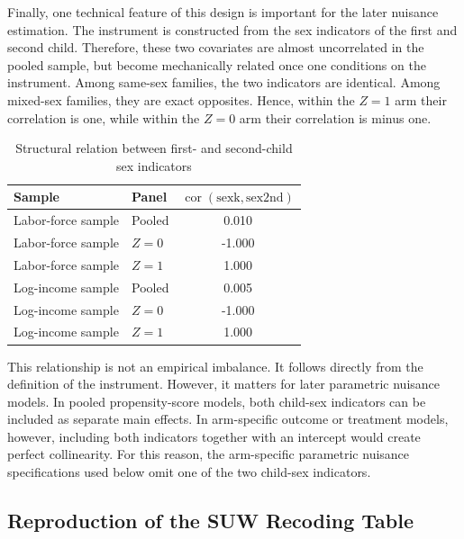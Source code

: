 \documentclass[12pt, a4paper, oneside]{article}
\theoremstyle{plain}
\theoremstyle{definition}
\begin{document}
Finally, one technical feature of this design is important for the later nuisance estimation. The instrument is constructed from the sex indicators of the first and second child. Therefore, these two covariates are almost uncorrelated in the pooled sample, but become mechanically related once one conditions on the instrument. Among same-sex families, the two indicators are identical. Among mixed-sex families, they are exact opposites. Hence, within the \(Z=1\) arm their correlation is one, while within the \(Z=0\) arm their correlation is minus one.
\begin{table}[H]
\centering
\caption{Structural relation between first- and second-child sex indicators}
\label{tab:ae_child_sex_correlation}
\begin{tabular}{llc}
\toprule
Sample & Panel & \(\operatorname{cor}(\text{sexk},\text{sex2nd})\) \\
\midrule
Labor-force sample & Pooled & 0.010 \\
Labor-force sample & \(Z=0\) & -1.000 \\
Labor-force sample & \(Z=1\) & 1.000 \\
Log-income sample & Pooled & 0.005 \\
Log-income sample & \(Z=0\) & -1.000 \\
Log-income sample & \(Z=1\) & 1.000 \\
\bottomrule
\end{tabular}
\end{table}
This relationship is not an empirical imbalance. It follows directly from the definition of the instrument. However, it matters for later parametric nuisance models. In pooled propensity-score models, both child-sex indicators can be included as separate main effects. In arm-specific outcome or treatment models, however, including both indicators together with an intercept would create perfect collinearity. For this reason, the arm-specific parametric nuisance specifications used below omit one of the two child-sex indicators.

\subsection{Reproduction of the SUW Recoding Table}
\label{subsec:ae_child_reproduction}
\end{document}
